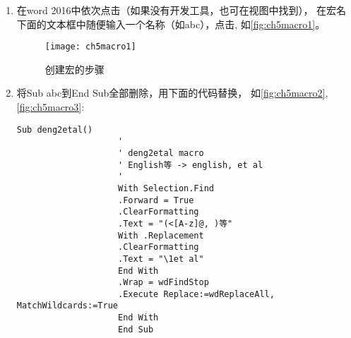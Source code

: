 \documentclass[cn,11pt,chinese]{elegantbook}
\begin{document}
			\begin{enumerate}
				\item 在word 2016中依次点击（如果没有开发工具，也可在视图中找到），
				在宏名下面的文本框中随便输入一个名称（如abc），点击,
				如\autoref{fig:ch5macro1}。
					\begin{figure}[htbp]
						\centering
						\texttt{[image: ch5macro1]}
						\caption{创建宏的步骤}
						\label{fig:ch5macro1}
					\end{figure}
				\item 将Sub abc到End Sub全部删除，用下面的代码替换，
				如\autoref{fig:ch5macro2},\autoref{fig:ch5macro3}:
				\begin{lstlisting}[language=VBScript]
					Sub deng2etal()
					'
					' deng2etal macro
					' English等 -> english, et al
					'
					With Selection.Find
					.Forward = True
					.ClearFormatting
					.Text = "(<[A-z]@, )等"
					With .Replacement
					.ClearFormatting
					.Text = "\1et al"
					End With
					.Wrap = wdFindStop
					.Execute Replace:=wdReplaceAll, MatchWildcards:=True
					End With
					End Sub
			\end{lstlisting}
			

\end{enumerate}
\end{document}
